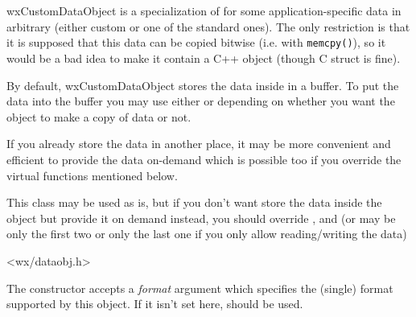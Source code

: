\section{}\label{wxcustomdataobject}

wxCustomDataObject is a specialization of
 for some
application-specific data in arbitrary (either custom or one of the standard
ones). The only restriction is that it is supposed that this data can be
copied bitwise (i.e. with {\tt memcpy()}), so it would be a bad idea to make
it contain a C++ object (though C struct is fine).

By default, wxCustomDataObject stores the data inside in a buffer. To put the
data into the buffer you may use either
 or
 depending on whether you want
the object to make a copy of data or not.

If you already store the data in another place, it may be more convenient and
efficient to provide the data on-demand which is possible too if you override
the virtual functions mentioned below.


This class may be used as is, but if you don't want store the data inside the
object but provide it on demand instead, you should override
,
 and
 (or may be only the first two or
only the last one if you only allow reading/writing the data)




<wx/dataobj.h>




\label{wxcustomdataobjectwxcustomdataobject}


The constructor accepts a {\it format} argument which specifies the (single)
format supported by this object. If it isn't set here,
 should be used.

